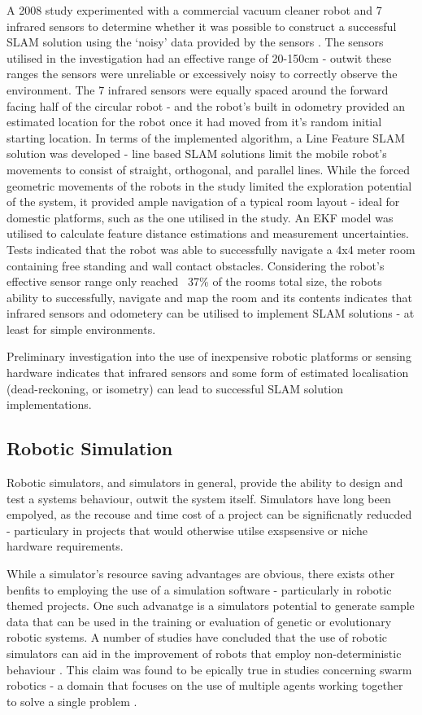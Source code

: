 A 2008 study experimented with a commercial vacuum cleaner robot and 7 infrared
sensors to determine whether it was possible to construct a successful SLAM
solution using the `noisy' data provided by the sensors \cite{Choi2008}.
The sensors utilised in the investigation had an effective range of 20-150cm -
outwit these ranges the sensors were unreliable or excessively noisy to
correctly observe the environment.
The 7 infrared sensors were equally spaced around the forward facing half of
the circular robot - and the robot's built in odometry provided an estimated
location for the robot once it had moved from it's random initial starting
location.
In terms of the implemented algorithm, a  Line Feature SLAM solution was
developed - line based SLAM solutions limit the mobile robot's movements to
consist of straight, orthogonal, and parallel lines.
While the forced geometric movements of the robots in the study limited the
exploration potential of the system, it provided ample navigation of a typical
room layout - ideal for domestic platforms, such as the one utilised in the
study.
An EKF model was utilised to calculate feature distance estimations and
measurement uncertainties.
Tests indicated that the  robot was able to successfully navigate a 4x4 meter
room containing free standing and wall contact obstacles.
Considering the robot's effective sensor range only reached ~37\% of the rooms
total size, the robots ability to successfully, navigate and map the room and
its contents indicates that infrared sensors and odometery can be utilised to
implement SLAM solutions - at least for simple environments.

Preliminary investigation into the use of inexpensive robotic platforms or
sensing hardware indicates that infrared sensors and some form of estimated
localisation (dead-reckoning, or isometry) can lead to successful SLAM solution
implementations.


\subsection{Robotic Simulation} \label{sec_sim}
Robotic simulators, and simulators in general, provide the ability to design
and test a  systems behaviour, outwit the system itself. 
Simulators have long been empolyed, as the recouse and time cost of a project
can be significnatly reducded - particulary in projects that would otherwise
utilse exspsensive or niche hardware requirements.

While a simulator's resource saving advantages are obvious, there exists other
benfits to employing the use of a simulation software - particularly in
robotic themed projects.
One such advanatge is a simulators potential to generate sample data that can
be used in the training or evaluation of genetic or evolutionary robotic
systems.
A number of studies have concluded that the use of robotic simulators can
aid in the improvement of robots that employ non-deterministic behaviour
\cite{7139550,7139557}.
This claim was found to be epically true in studies concerning swarm robotics
- a domain that focuses on the use of multiple agents working together to solve
a single problem \cite{Wischmann864,R2016,Yao2014}.

